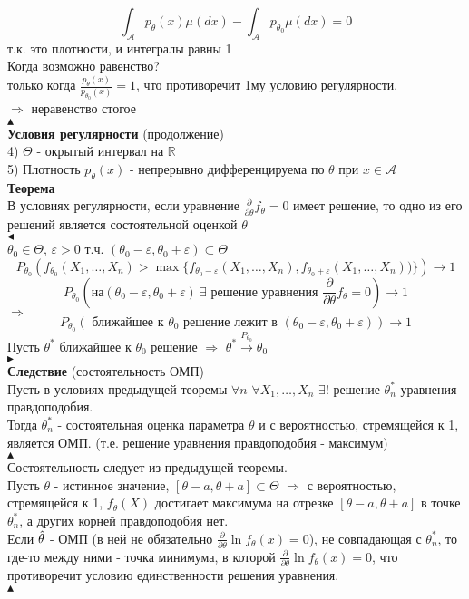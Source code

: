 \documentclass[25pt]{article}
\begin{document}
$$\int_\mathcal{A}{p_\theta(x)\mu(d x)} -\int_\mathcal{A}{p_{\theta_0}\mu(d x)} = 0$$
т.к. это плотности, и интегралы равны 1\\
Когда возможно равенство?\\
только когда $\frac{p_\theta(x)}{p_{\theta_0}(x)} = 1$, что противоречит 1му условию регулярности.\\
$\Rightarrow$ неравенство стогое    
\\
$\blacktriangle$
\\
\textbf{Условия регулярности} (продолжение)
\\
4) $\Theta$ - окрытый интервал на $\mathbb{R}$\\
5) Плотность $p_\theta(x)$ - непрерывно дифференцируема по $\theta$ при $x\in\mathcal{A}$\\
\textbf{Теорема}\\
В условиях регулярности, если уравнение $\frac{\partial}{\partial\theta}f_\theta = 0$ имеет решение, то одно из его решений является состоятельной оценкой $\theta$\\
$\blacktriangleleft$\\
$\theta_0\in\Theta$, $\varepsilon>0$ т.ч. $(\theta_0 -\varepsilon, \theta_0 + \varepsilon) \subset\Theta$\\
$$P_{\theta_0}\left( f_{\theta_0}(X_1,\dots,X_n) > \max\{ f_{\theta_0 - \varepsilon}(X_1,\dots,X_n),f_{\theta_0 + \varepsilon}(X_1,\dots,X_n) ) \}  \right) \rightarrow 1$$
$$P_{\theta_0}\left( \text{на} (\theta_0 -\varepsilon, \theta_0 + \varepsilon) \ \exists\text{ решение уравнения } \frac{\partial}{\partial\theta}f_\theta = 0    \right) \rightarrow 1 $$
$\Rightarrow$
$$ P_{\theta_0}\left(\text{ ближайшее к } \theta_0 \text{ решение лежит в } (\theta_0 - \varepsilon, \theta_0 + \varepsilon)\right) \rightarrow 1 $$
Пусть $\theta^*$ ближайшее к $\theta_0$ решение $\Rightarrow$ $\theta^*\xrightarrow{P_{\theta_0}}\theta_0$\\
$\blacktriangleright$\\

\textbf{Следствие} (состоятельность ОМП)\\
Пусть в условиях предыдущей теоремы $\forall n$ $\forall X_1,\dots,X_n$ $\exists!$ решение $\theta_n^*$ уравнения правдоподобия.\\
Тогда $\theta^*_n$ - состоятельная оценка параметра $\theta$ и с вероятностью, стремящейся к 1, является ОМП. (т.е. решение уравнения правдоподобия - максимум)\\
$\blacktriangle$
\\
Состоятельность следует из предыдущей теоремы.\\
Пусть $\theta$ - истинное значение, $[\theta-a,\theta+a]\subset\Theta$
$\Rightarrow$ с вероятностью, стремящейся к 1, $f_\theta(X)$ достигает максимума на отрезке $[\theta-a,\theta+a]$ в точке $\theta^*_n$, а других корней правдоподобия нет.\\
Если $\Hat{\theta}$ - ОМП (в ней не обязательно $\frac{\partial}{\partial\theta}\ln{f_\theta(x)}=0$), не совпадающая с $\theta^*_n$, то где-то между ними - точка минимума, в которой $\frac{\partial}{\partial\theta}\ln{f_\theta(x)}=0$, что противоречит условию единственности решения уравнения.\\
$\blacktriangle$
\\
\end{document}
